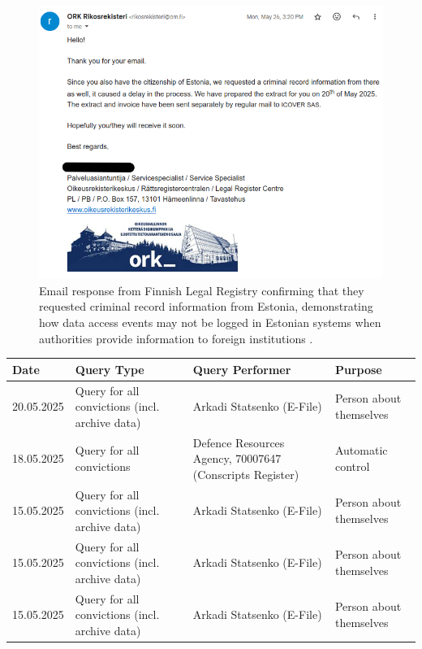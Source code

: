\begin{figure}[H]
\centering
\includegraphics[width=450px]{english/figures/Screenshot from 2025-08-09 11-59-33.png}
\caption{Email response from Finnish Legal Registry confirming that they requested criminal record information from Estonia, demonstrating how data access events may not be logged in Estonian systems when authorities provide information to foreign institutions \cite{e-toimik-screenshot}.}
\label{fig:finnish-legal-registry-email}
\end{figure}

\begin{small}
\begin{center}
\begin{tabular}{|p{2.5cm}|p{4.5cm}|p{4cm}|p{2.5cm}|}
\hline
\textbf{Date} & \textbf{Query Type} & \textbf{Query Performer} & \textbf{Purpose} \\
\hline
20.05.2025 & Query for all convictions (incl. archive data) & Arkadi Statsenko (E-File) & Person about themselves \\
\hline
18.05.2025 & Query for all convictions & Defence Resources Agency, 70007647 (Conscripts Register) & Automatic control \\
\hline
15.05.2025 & Query for all convictions (incl. archive data) & Arkadi Statsenko (E-File) & Person about themselves \\
\hline
15.05.2025 & Query for all convictions (incl. archive data) & Arkadi Statsenko (E-File) & Person about themselves \\
\hline
15.05.2025 & Query for all convictions (incl. archive data) & Arkadi Statsenko (E-File) & Person about themselves \\
\hline
\end{tabular}
\end{center}
\end{small}

